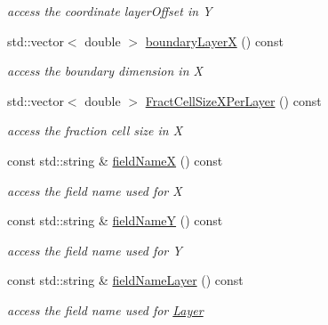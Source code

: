 \begin{DoxyCompactItemize}
\begin{DoxyCompactList}\small\item\em access the coordinate layerOffset in Y \item\end{DoxyCompactList}\item 
std::vector$<$ double $>$ \hyperlink{class_d_d4hep_1_1_d_d_segmentation_1_1_tiled_layer_grid_x_y_a5302fa68f6d9dde47079504b6ce4608d}{boundaryLayerX} () const 
\begin{DoxyCompactList}\small\item\em access the boundary dimension in X \item\end{DoxyCompactList}\item 
std::vector$<$ double $>$ \hyperlink{class_d_d4hep_1_1_d_d_segmentation_1_1_tiled_layer_grid_x_y_a328d361bb8b6d45143b940539dbb089e}{FractCellSizeXPerLayer} () const 
\begin{DoxyCompactList}\small\item\em access the fraction cell size in X \item\end{DoxyCompactList}\item 
const std::string \& \hyperlink{class_d_d4hep_1_1_d_d_segmentation_1_1_tiled_layer_grid_x_y_a68e8c0f2eda5eeec041759b2c688272f}{fieldNameX} () const 
\begin{DoxyCompactList}\small\item\em access the field name used for X \item\end{DoxyCompactList}\item 
const std::string \& \hyperlink{class_d_d4hep_1_1_d_d_segmentation_1_1_tiled_layer_grid_x_y_ad401dafbadacc2036d67181928682742}{fieldNameY} () const 
\begin{DoxyCompactList}\small\item\em access the field name used for Y \item\end{DoxyCompactList}\item 
const std::string \& \hyperlink{class_d_d4hep_1_1_d_d_segmentation_1_1_tiled_layer_grid_x_y_a8a21faf4be7569e667a271846705f9f9}{fieldNameLayer} () const 
\begin{DoxyCompactList}\small\item\em access the field name used for \hyperlink{class_d_d4hep_1_1_layer}{Layer} \item\end{DoxyCompactList}\item 

\end{DoxyCompactItemize}
